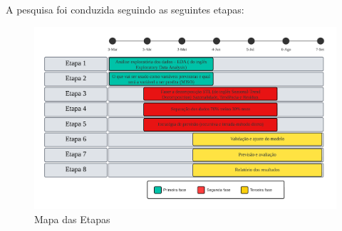 A pesquisa foi conduzida seguindo as seguintes etapas:

\begin{figure}[!htpb]
	\centering
	\caption{Mapa das Etapas}
	\label{fig:etapas}
	\includegraphics[width=1\linewidth]{Introducao/Figuras/Etapas}
	
\end{figure}

